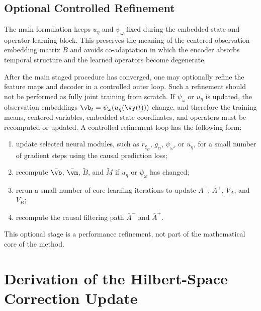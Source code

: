 \documentclass[twoside,11pt]{article}
\begin{document}
\subsection{Optional Controlled Refinement}

The main formulation keeps $u_\eta$ and $\psi_\omega$ fixed during the
embedded-state and operator-learning block. This preserves the meaning
of the centered observation-embedding matrix $\tilde B$ and avoids
co-adaptation in which the encoder absorbs temporal structure and the
learned operators become degenerate.

After the main staged procedure has converged, one may optionally refine
the feature maps and decoder in a controlled outer loop. Such a
refinement should not be performed as fully joint training from scratch.
If $\psi_\omega$ or $u_\eta$ is updated, the observation embeddings
$\vb_t=\psi_\omega(u_\eta(\vy(t)))$ change, and therefore the training
means, centered variables, embedded-state coordinates, and operators
must be recomputed or updated. A controlled refinement loop has the
following form:
\begin{enumerate}
\item update selected neural modules, such as $r_{\xi_B}$, $g_\alpha$,
$\psi_\omega$, or $u_\eta$, for a small number of gradient steps using
the causal prediction loss;
\item recompute $\bar{\vb}$, $\bar{\vm}$, $\tilde B$, and $\tilde M$ if
$u_\eta$ or $\psi_\omega$ has changed;
\item rerun a small number of core learning iterations to update
$A^-$, $A^+$, $V_A$, and $V_B$;
\item recompute the causal filtering path $\bar A^-$ and $\bar A^+$.
\end{enumerate}
This optional stage is a performance refinement, not part of the
mathematical core of the method.


\acks{

}


\newpage


\appendix

\section{Derivation of the Hilbert-Space Correction Update}
\label{app:hilbert_correction_derivation}
\end{document}
